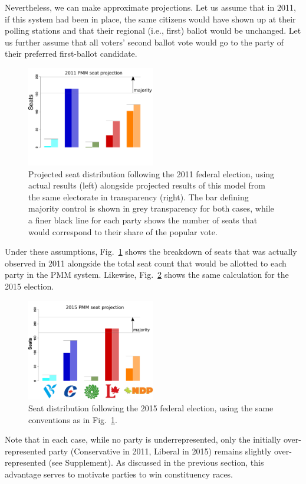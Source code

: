 Nevertheless, we can make approximate projections. Let us assume that in 2011, if this system had been in place, the same citizens would have shown up at their polling stations and that their regional (i.e., first) ballot would be unchanged. 
Let us further assume that all voters' second ballot vote would go to the party of their preferred first-ballot candidate. 
\begin{figure}
  \includegraphics[width=0.50\textwidth,clip]{Figs/2011_seat_projection}
  \caption{ Projected seat distribution following the 2011 federal election, using actual results (left) alongside projected results of this model from the same electorate in transparency (right). The bar defining majority control is shown in grey transparency for both cases, while a finer black line for each party shows the number of seats that would correspond to their share of the popular vote.
}
\label{fig:hypo_2011}
\end{figure}
Under these assumptions, Fig.~\ref{fig:hypo_2011} shows the breakdown of seats that was actually observed in 2011 alongside the total seat count that would be allotted to each party in the PMM system. 
Likewise, Fig.~\ref{fig:hypo_2015} shows the same calculation for the 2015 election. 

\begin{figure}[h!]
  \includegraphics[width=0.50\textwidth,clip]{Figs/2015_seat_projection}
  \caption{ Seat distribution following the 2015 federal election, using the same conventions as in Fig.~\ref{fig:hypo_2011}.}
\label{fig:hypo_2015}
\end{figure}
Note that in each case, while no party is underrepresented, only the initially over-represented party (Conservative in 2011, Liberal in 2015) remains slightly over-represented (see Supplement). 
As discussed in the previous section, this advantage serves to motivate parties to win constituency races.

